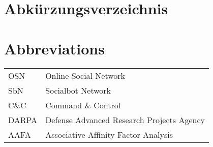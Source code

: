 \ifmmtlanguagegerman
\section*{Abkürzungsverzeichnis}
\else
\section*{Abbreviations}
\fi

\begin{table}[h]		
	\begin{tabular}{ll}
		OSN & Online Social Network \\
		SbN & Socialbot Network \\
		C\&C & Command \& Control \\
		DARPA & Defense Advanced Research Projects Agency \\
		AAFA & Associative Affinity Factor Analysis \\	
		
	\end{tabular}
\end{table}
